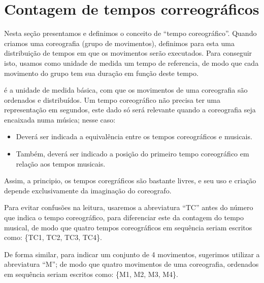 
\section{Contagem de tempos correográficos}
\label{sec:TemposCoreograficos}
Nesta seção presentamos e definimos o conceito de ``tempo coreográfico''.
Quando criamos uma coreografia (grupo de movimentos), 
definimos para esta uma distribuição de tempos em que os movimentos serão executados.
Para conseguir isto, usamos como unidade de medida um tempo de referencia,
de modo que cada movimento do grupo tem sua duração em função deste tempo.
\begin{definition} 
\label{def:tempocoreografico}
é a unidade de medida básica, com que os movimentos de uma coreografia são ordenados e distribuídos.
Um tempo coreográfico não precisa ter uma representação em segundos,
este dado só será relevante quando a coreografia seja encaixada numa música;
nesse caso: 
\begin{itemize}
\item Deverá ser indicada a equivalência entre os tempos coreográficos e musicais.
\item Também, deverá ser indicado a posição do primeiro tempo coreográfico em relação aos tempos musicais.
\end{itemize}
\end{definition}
Assim, a principio, os tempos coregráficos são bastante livres, 
e seu uso e criação depende exclusivamente da imaginação do coreografo.


Para evitar confusões na leitura, usaremos a abreviatura ``TC'' 
antes do número que indica o tempo coreográfico,
para diferenciar este da contagem do tempo musical,
de modo que quatro tempos coreográficos em sequência seriam escritos como: 
\{TC1, TC2, TC3, TC4\}.

De forma similar, para indicar um conjunto de 4 movimentos, 
sugerimos utilizar a abreviatura ``M''; de modo que quatro movimentos de uma coreografia,
ordenados em sequência seriam escritos como: 
\{M1, M2, M3, M4\}.

